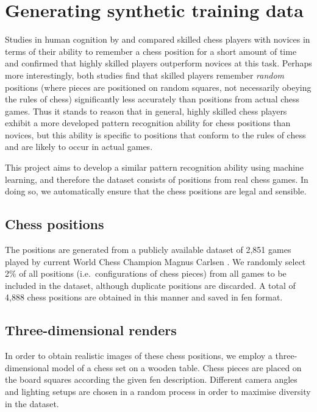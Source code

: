 \documentclass[../report.tex]{subfiles}
\begin{document}
\chapter{Generating synthetic training data}
\label{chap:data_synthesis}

Studies in human cognition by \textcite{bilalic2010} and \textcite{zhou2018} compared skilled chess players with novices in terms of their ability to remember a chess position for a short amount of time and confirmed that highly skilled players outperform novices at this task.
Perhaps more interestingly, both studies find that skilled players remember \emph{random} positions (where pieces are positioned on random squares, not necessarily obeying the rules of chess) significantly less accurately than positions from actual chess games. 
Thus it stands to reason that in general, highly skilled chess players exhibit a more developed pattern recognition ability for chess positions than novices, but this ability is specific to positions that conform to the rules of chess and are likely to occur in actual games.

This project aims to develop a similar pattern recognition ability using machine learning, and therefore the dataset consists of positions from real chess games. 
In doing so, we automatically ensure that the chess positions are legal and sensible.

\section{Chess positions}
\label{sec:data_chess_positions}
The positions are generated from a publicly available dataset of 2,851 games played by current World Chess Champion Magnus Carlsen \cite{64squares2020}.
We randomly select 2\% of all positions (i.e.\ configurations of chess pieces) from all games to be included in the dataset, although duplicate positions are discarded.
A total of 4,888 chess positions are obtained in this manner and saved in \gls{fen} format.

\section{Three-dimensional renders}
\label{sec:3d_renders}
In order to obtain realistic images of these chess positions, we employ a three-dimensional model of a chess set on a wooden table. 
Chess pieces are placed on the board squares according the given \gls{fen} description. 
Different camera angles and lighting setups are chosen in a random process in order to maximise diversity in the dataset.
\end{document}
